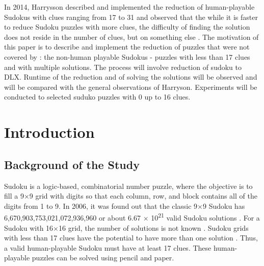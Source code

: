 \documentclass[a4paper,oneside,11pt]{report}
\begin{document}
In 2014, Harrysson described and implemented the reduction of human-playable Sudokus with clues ranging from 17 to 31 and observed that the while it is faster to reduce Sudoku puzzles with more clues, the difficulty of finding the solution does not reside in the number of clues, but on something else  \cite{Harrysson}. The motivation of this paper is to describe and implement the reduction of puzzles that were not covered by \cite{Harrysson} : the non-human playable Sudokus - puzzles with less than 17 clues and with multiple solutions. The process will involve reduction of sudoku to DLX. Runtime of the reduction and of solving the solutions will be observed and will be compared with the general observations of Harryson. Experiments will be conducted to selected suduko puzzles with 0 up to 16 clues.



\listoffigures

\newpage
{}
\listoftables

\tableofcontents


\newpage

\doublespacing

\chapter{Introduction}

\section{Background of the Study}Sudoku is a logic-based, combinatorial number puzzle, where the objective is to fill a 9$\times$9 grid with digits so that each column, row, and block contains all of the digits from 1 to 9. In 2006, it was found out that the classic 9$\times$9 Sudoku has 6,670,903,753,021,072,936,960 or about 6.67 $\times$ 10\textsuperscript{21} valid Sudoku solutions \cite{Felgenhauer}. For a Sudoku with 16$\times$16 grid, the number of solutions is not known \cite{Kapanowski}. Sudoku grids with less than 17 clues have the potential to have more than one solution \cite{McGuire}. Thus, a valid human-playable Sudoku must have at least 17 clues. These human-playable puzzles can be solved using pencil and paper.\\
\end{document}

